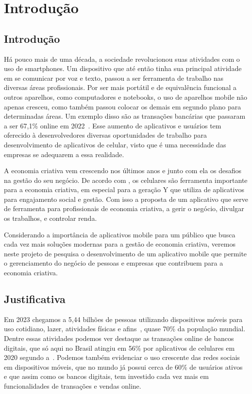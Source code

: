 \chapter{Introdução}\label{ch:introducao}
\section{Introdução}

Há pouco mais de uma década, a sociedade revolucionou suas atividades com o uso de smartphones.
Um dispositivo que até então tinha sua principal atividade em se comunicar por voz e texto, passou a ser ferramenta de trabalho nas diversas áreas profissionais.
Por ser mais portátil e de equivalência funcional a outros aparelhos, como computadores e notebooks, o uso de aparelhos mobile não apenas cresceu, como também passou colocar os demais em segundo plano para determinadas áreas.
Um exemplo disso são as transações bancárias que passaram a ser 67,1\% online em 2022~\cite{bebraban2022}.
Esse aumento de aplicativos e usuários tem oferecido à desenvolvedores diversas oportunidades de trabalho para desenvolvimento de aplicativos de celular, visto que é uma necessidade das empresas se adequarem a essa realidade.

A economia criativa vem crescendo nos últimos anos e junto com ela os desafios na gestão do seu negócio.
De acordo com , os celulares são ferramenta importante para a economia criativa, em especial para a geração Y que utiliza de aplicativos para engajamento social e gestão.
Com isso a proposta de um aplicativo que serve de ferramenta para profissionais de economia criativa, a gerir o negócio, divulgar os trabalhos, e controlar renda.

Considerando a importância de aplicativos mobile para um público que busca cada vez mais soluções modernas para a gestão de economia criativa, veremos neste projeto de pesquisa o desenvolvimento de um aplicativo mobile que permite o gerenciamento do negócio de pessoas e empresas que contribuem para a economia criativa.

\section{Justificativa}\label{sec:justificativa}

Em 2023 chegamos a 5,44 bilhões de pessoas utilizando dispositivos móveis para uso cotidiano, lazer, atividades físicas e afins~\cite{wearesocial}, quase 70\% da população mundial.
Dentre essas atividades podemos ver destaque as transações online de bancos digitais, que só aqui no Brasil atingiu em 56\% por aplicativos de celulares em 2020 segundo a~.
Podemos também evidenciar o uso crescente das redes sociais em dispositivos móveis, que no mundo já possui cerca de 60\% de usuários ativos~\cite{wearesocial} e que assim como os bancos digitais, tem investido cada vez mais em funcionalidades de transações e vendas online.


